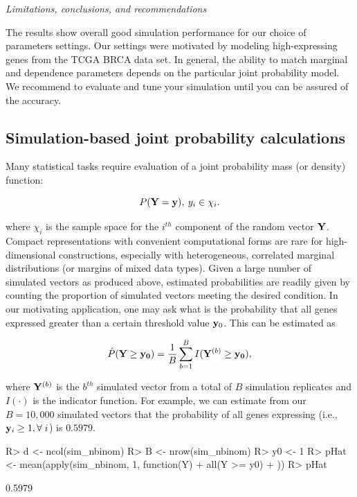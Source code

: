 \documentclass[
]{jss}
\begin{document}
\emph{Limitations, conclusions, and recommendations}

The results show overall good simulation performance for our choice of
parameters settings. Our settings were motivated by modeling
high-expressing genes from the TCGA BRCA data set. In general, the
ability to match marginal and dependence parameters depends on the
particular joint probability model. We recommend to evaluate and tune
your simulation until you can be assured of the accuracy.

\hypertarget{simulation-based-joint-probability-calculations}{%
\subsection{Simulation-based joint probability
calculations}\label{simulation-based-joint-probability-calculations}}

Many statistical tasks require evaluation of a joint probability mass
(or density) function:

\[
P( {\bf Y} = {\bf y} ), \: y_i \in \chi_i.
\]

where \(\chi_i\) is the sample space for the \(i^{th}\) component of the
random vector \(\bf{Y}\). Compact representations with convenient
computational forms are rare for high-dimensional constructions,
especially with heterogeneous, correlated marginal distributions (or
margins of mixed data types). Given a large number of simulated vectors
as produced above, estimated probabilities are readily given by counting
the proportion of simulated vectors meeting the desired condition. In
our motivating application, one may ask what is the probability that all
genes expressed greater than a certain threshold value \({\bf y}_0\).
This can be estimated as

\[
\hat{P}( {\bf Y} \ge {\bf y_0 } ) = \frac{1}{B} \sum_{b=1}^B I( {\bf Y}^{ (b) } \ge {\bf y_0} ),
\]

where \({\bf Y}^{(b)}\) is the \(b^{th}\) simulated vector from a total
of \(B\) simulation replicates and \(I(\cdot)\) is the indicator
function. For example, we can estimate from our \(B=10,000\) simulated
vectors that the probability of all genes expressing (i.e.,
\({\bf y}_i \geq 1, \forall \; i\)) is \(0.5979\).

\begin{CodeChunk}
\begin{CodeInput}
R> d <- ncol(sim_nbinom)
R> B <- nrow(sim_nbinom)
R> y0 <- 1
R> pHat <- mean(apply(sim_nbinom, 1, function(Y) {
+   all(Y >= y0)
+ }))
R> pHat
\end{CodeInput}
\begin{CodeOutput}
[1] 0.5979
\end{CodeOutput}
\end{CodeChunk}
\end{document}

